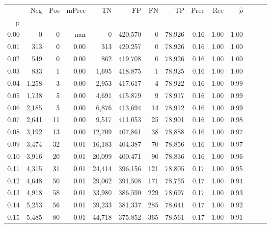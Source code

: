 \begin{tabular}{rrrrrrrrrrrrrr}
\toprule
{} &    Neg &    Pos & mPrec &       TN &       FP &      FN &      TP &  Prec &   Rec & $\hat{p}$ \\
p    &        &        &       &          &          &         &         &       &       &           \\
\midrule
0.00 &      0 &      0 &   nan &        0 &  420,570 &       0 &  78,926 &  0.16 &  1.00 &      1.00 \\
0.01 &    313 &      0 &  0.00 &      313 &  420,257 &       0 &  78,926 &  0.16 &  1.00 &      1.00 \\
0.02 &    549 &      0 &  0.00 &      862 &  419,708 &       0 &  78,926 &  0.16 &  1.00 &      1.00 \\
0.03 &    833 &      1 &  0.00 &    1,695 &  418,875 &       1 &  78,925 &  0.16 &  1.00 &      1.00 \\
0.04 &  1,258 &      3 &  0.00 &    2,953 &  417,617 &       4 &  78,922 &  0.16 &  1.00 &      0.99 \\
0.05 &  1,738 &      5 &  0.00 &    4,691 &  415,879 &       9 &  78,917 &  0.16 &  1.00 &      0.99 \\
0.06 &  2,185 &      5 &  0.00 &    6,876 &  413,694 &      14 &  78,912 &  0.16 &  1.00 &      0.99 \\
0.07 &  2,641 &     11 &  0.00 &    9,517 &  411,053 &      25 &  78,901 &  0.16 &  1.00 &      0.98 \\
0.08 &  3,192 &     13 &  0.00 &   12,709 &  407,861 &      38 &  78,888 &  0.16 &  1.00 &      0.97 \\
0.09 &  3,474 &     32 &  0.01 &   16,183 &  404,387 &      70 &  78,856 &  0.16 &  1.00 &      0.97 \\
0.10 &  3,916 &     20 &  0.01 &   20,099 &  400,471 &      90 &  78,836 &  0.16 &  1.00 &      0.96 \\
0.11 &  4,315 &     31 &  0.01 &   24,414 &  396,156 &     121 &  78,805 &  0.17 &  1.00 &      0.95 \\
0.12 &  4,648 &     50 &  0.01 &   29,062 &  391,508 &     171 &  78,755 &  0.17 &  1.00 &      0.94 \\
0.13 &  4,918 &     58 &  0.01 &   33,980 &  386,590 &     229 &  78,697 &  0.17 &  1.00 &      0.93 \\
0.14 &  5,253 &     56 &  0.01 &   39,233 &  381,337 &     285 &  78,641 &  0.17 &  1.00 &      0.92 \\
0.15 &  5,485 &     80 &  0.01 &   44,718 &  375,852 &     365 &  78,561 &  0.17 &  1.00 &      0.91 \\

\end{tabular}
